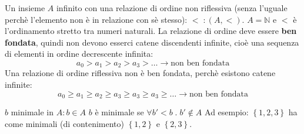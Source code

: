 \documentclass[a4paper]{article}
\begin{document}
\vspace{1em}
\noindent
Un insieme \( A \) infinito con una relazione di ordine non riflessiva (senza l'uguale
perchè l'elemento non è in relazione con sè stesso): \( < \;: (A, <) \).
\( A = \mathbb{N} \) e \( < \) è l'ordinamento
stretto tra numeri naturali. La relazione di ordine deve essere \textbf{ben fondata},
quindi non devono esserci catene discendenti infinite, cioè una sequenza di elementi in
ordine decrescente infinita:
\[
  a_0 > a_1 > a_2 > a_3 > \ldots \to \text{non ben fondata}
\] 
Una relazione di ordine riflessiva non è ben fondata, perchè esistono catene
infinite:
\[
  a_0 \geq a_1 \geq a_2 \geq a_3 \geq a_3 \geq a_3 \geq \ldots \to \text{non ben fondata}
\]

\( b \) minimale in \( A : b \in A \) \( b \) è minimale se \( \forall b' < b \;.\; b' \notin A \) 
Ad esempio: \( \left\{ 1, 2, 3 \right\} \) ha come minimali (di contenimento) \( \left\{ 1, 2 \right\} \) 
e \( \left\{ 2,3 \right\} \).
\end{document}
